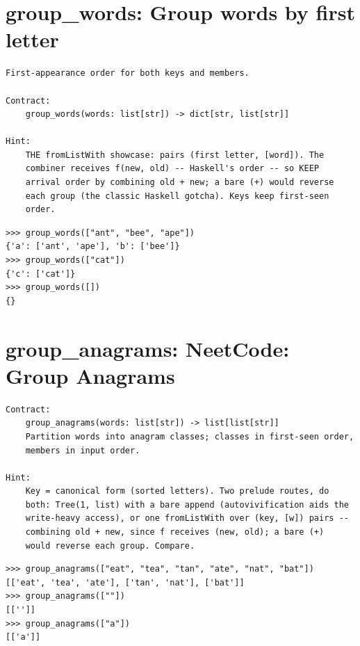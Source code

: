 \documentclass[10pt,letterpaper]{book}
\begin{document}
\section{group\_words: Group words by first letter}
\begin{lstlisting}[style=ex]
First-appearance order for both keys and members.

Contract:
    group_words(words: list[str]) -> dict[str, list[str]]

Hint:
    THE fromListWith showcase: pairs (first letter, [word]). The
    combiner receives f(new, old) -- Haskell's order -- so KEEP
    arrival order by combining old + new; a bare (+) would reverse
    each group (the classic Haskell gotcha). Keys keep first-seen
    order.
\end{lstlisting}
\begin{lstlisting}[style=ex]
>>> group_words(["ant", "bee", "ape"])
{'a': ['ant', 'ape'], 'b': ['bee']}
>>> group_words(["cat"])
{'c': ['cat']}
>>> group_words([])
{}
\end{lstlisting}

\section{group\_anagrams: NeetCode: Group Anagrams}
\begin{lstlisting}[style=ex]
Contract:
    group_anagrams(words: list[str]) -> list[list[str]]
    Partition words into anagram classes; classes in first-seen order,
    members in input order.

Hint:
    Key = canonical form (sorted letters). Two prelude routes, do
    both: Tree(1, list) with a bare append (autovivification aids the
    write-heavy access), or one fromListWith over (key, [w]) pairs --
    combining old + new, since f receives (new, old); a bare (+)
    would reverse each group. Compare.
\end{lstlisting}
\begin{lstlisting}[style=ex]
>>> group_anagrams(["eat", "tea", "tan", "ate", "nat", "bat"])
[['eat', 'tea', 'ate'], ['tan', 'nat'], ['bat']]
>>> group_anagrams([""])
[['']]
>>> group_anagrams(["a"])
[['a']]
\end{lstlisting}
\end{document}
